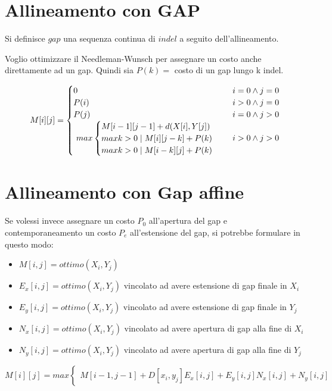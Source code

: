 \section{Allineamento con GAP}

Si definisce $gap$ una sequenza continua di $indel$ a seguito dell'allineamento.

Voglio ottimizzare il Needleman-Wunsch per assegnare un costo anche direttamente ad un gap. Quindi sia $P(k) = $ costo di un gap lungo k indel.

\[
M[i][j] =
\begin{cases}
  \text{$0$} & \text{$i = 0 \land j = 0$} \\
  \text{$P(i)$} & \text{$i > 0 \land j = 0$} \\
  \text{$P(j)$} & \text{$i = 0 \land j > 0$} \\
  \text{
    $
    max 
    \begin{cases}
      M[i-1][j-1] + d(X[i], Y[j]) \\
      max k>0 \mid M[i][j-k] + P(k) \\
      max k>0 \mid M[i-k][j] + P(k) \\
    \end{cases}
    $
  } & \text{$i > 0 \land j > 0$}
\end{cases}
\]

\section{Allineamento con Gap affine}

Se volessi invece assegnare un costo $P_0$ all'apertura del gap e contemporaneamento un costo $P_e$ all'estensione del gap, si potrebbe formulare in questo modo:

\begin{itemize}
\item $M[i,j] = ottimo(X_i, Y_j)$
\item $E_x[i,j] = ottimo(X_i, Y_j)$ vincolato ad avere estensione di gap finale in $X_i$
\item $E_y[i,j] = ottimo(X_i, Y_j)$ vincolato ad avere estensione di gap finale in $Y_j$
\item $N_x[i,j] = ottimo(X_i, Y_j)$ vincolato ad avere apertura di gap alla fine di $X_i$
\item $N_y[i,j] = ottimo(X_i, Y_j)$ vincolato ad avere apertura di gap alla fine di $Y_j$
\end{itemize}

\[
M[i][j] = max
\begin{cases}
  M[i-1,j-1] + D[x_i, y_j]
  E_x[i,j] + E_y[i,j]
  N_x[i,j] + N_y[i,j]
\end{cases}
\]


